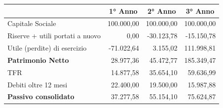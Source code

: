 \documentclass[12pt, a4paper]{article}
\begin{document}
\begin{center}
    \begin{tabular}{|l|r|r|r|}
        \hline
        \rowcolor[HTML]{CBCEFB}
        \multicolumn{1}{|c|}{\cellcolor[HTML]{CBCEFB}\textbf{PASSIVO}} & \multicolumn{1}{c|}{\cellcolor[HTML]{CBCEFB}\textbf{1° Anno}} & \multicolumn{1}{c|}{\cellcolor[HTML]{CBCEFB}\textbf{2° Anno}} & \multicolumn{1}{c|}{\cellcolor[HTML]{CBCEFB}\textbf{3° Anno}} \\ \hline
        Capitale Sociale                                               & 100.000,00                                                     & 100.000,00                                                     & 100.000,00                                                     \\ \hline
        Riserve + utili portati a nuovo                                & 0,00                                                          & -30.123,78                                                    & -15.150,78                                                    \\ \hline
        Utile (perdite) di esercizio                                   & -71.022,64                                                    & 3.155,02                                                      & 111.998,81                                                    \\ \hline
        \rowcolor[HTML]{EFEFEF}
        \textbf{Patrimonio Netto}                                      & 28.977,36                                                     & 45.472,77                                                     & 185.349,47                                                    \\ \hline
        TFR                                                            & 14.877,58                                                     & 35.654,10                                                     & 59.636,99                                                     \\ \hline
        Debiti oltre 12 mesi                                           & 22.400,00                                                     & 19.500,00                                                     & 15.987,88                                                     \\ \hline
        \rowcolor[HTML]{EFEFEF}
        \textbf{Passivo consolidato}                                   & 37.277,58                                                     & 55.154,10                                                     & 75.624,87                                                     \\ \hline

\end{tabular}
\end{center}
\end{document}
